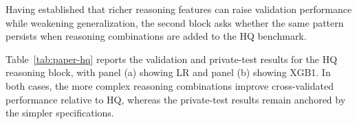 \documentclass{article}
\theoremstyle{plain}
\theoremstyle{definition}
\theoremstyle{remark}
\begin{document}
\begin{table}[t]
\centering
\small
{}
\caption{Part 1 per-model validation vs private-test.}
\label{tab:paper-models}
\end{table}

Having established that richer reasoning features can raise validation performance while weakening generalization, the second block asks whether the same pattern persists when reasoning combinations are added to the HQ benchmark.

Table~\ref{tab:paper-hq} reports the validation and private-test results for the HQ reasoning block, with panel (a) showing LR and panel (b) showing XGB1. In both cases, the more complex reasoning combinations improve cross-validated performance relative to HQ, whereas the private-test results remain anchored by the simpler specifications.
\end{document}
